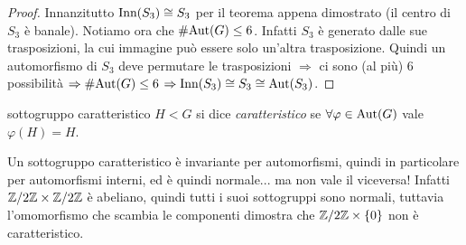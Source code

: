 \begin{proof}
    Innanzitutto $\text{Inn}(S_3) \cong S_3$ per il teorema appena dimostrato (il centro di $S_3$ è banale). Notiamo ora che $\#\text{Aut}(G) \leq 6$. Infatti $S_3$ è generato dalle sue trasposizioni, la cui immagine può essere solo un'altra trasposizione. Quindi un automorfismo di $S_3$ deve permutare le trasposizioni $\Rightarrow$ ci sono (al più) 6 possibilità $\Rightarrow \#\text{Aut}(G) \leq 6$ $\Rightarrow \text{Inn}(S_3) \cong S_3 \cong \text{Aut}(S_3)$.
\end{proof}
\begin{definition}{sottogruppo caratteristico}
    $H < G$ si dice \textit{caratteristico} se $\forall \varphi \in \text{Aut}(G)$ vale $\varphi(H)=H$.
\end{definition}

Un sottogruppo caratteristico è invariante per automorfismi, quindi in particolare per automorfismi interni, ed è quindi normale... ma non vale il viceversa! Infatti $\mathbb{Z}/2\mathbb{Z} \times \mathbb{Z}/2\mathbb{Z}$ è abeliano, quindi tutti i suoi sottogruppi sono normali, tuttavia l'omomorfismo che scambia le componenti dimostra che $\mathbb{Z}/2\mathbb{Z} \times \left\{ 0 \right\}$ non è caratteristico.

